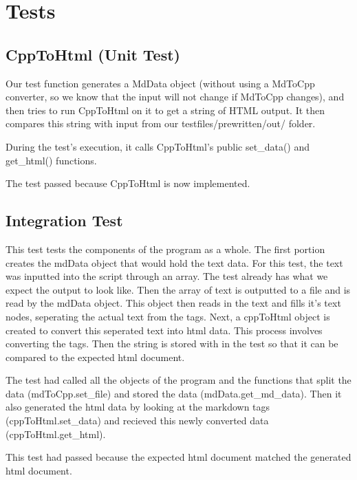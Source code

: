\section{Tests}
\subsection{CppToHtml (Unit Test)}

Our test function generates a MdData object (without using a MdToCpp converter, so we know that the input will not change if MdToCpp changes), and then tries to run CppToHtml on it to get a string of HTML output. It then compares this string with input from our testfiles/prewritten/out/  folder. 

During the test's execution, it calls CppToHtml's public set\_data() and get\_html() functions.

The test passed because CppToHtml is now implemented.


\subsection{Integration Test}
This test tests the components of the program as a whole. The first portion creates the mdData object that would hold the text data. For this test, the text was inputted into the script through an array. The test already has what we expect the output to look like. Then the array of text is outputted to a file and is read by the mdData object. This object then reads in the text and fills it's text nodes, seperating the actual text from the tags. Next, a cppToHtml object is created to convert this seperated text into html data. This process involves converting the tags. Then the string is stored with in the test so that it can be compared to the expected html document. 

The test had called all the objects of the program and the functions that split the data (mdToCpp.set\_file) and stored the data (mdData.get\_md\_data). Then it also generated the html data by looking at the markdown tags (cppToHtml.set\_data) and recieved this newly converted data (cppToHtml.get\_html).  

This test had passed because the expected html document matched the generated html document.  
